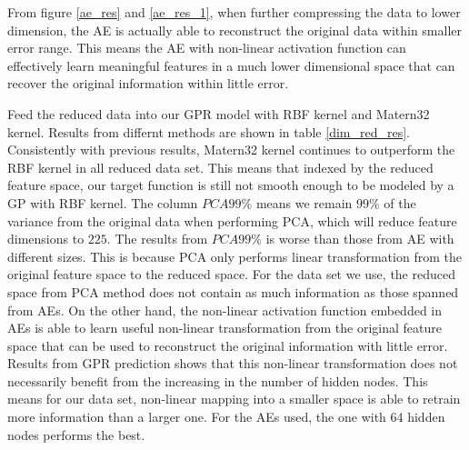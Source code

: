 \documentclass[11pt,a4paper]{article}
\theoremstyle{definition}
\numberwithin{equation}{section}
\begin{document}
	From figure \ref{ae_res} and \ref{ae_res_1}, when further compressing the data to lower dimension, the AE is actually able to reconstruct the original data within smaller error range. This means the AE with non-linear activation function can effectively learn meaningful features in a much lower dimensional space that can recover the original information within little error. 
	
	Feed the reduced data into our GPR model with RBF kernel and Matern32 kernel. Results from differnt methods are shown in table \ref{dim_red_res}. Consistently with previous results, Matern32 kernel continues to outperform the RBF kernel in all reduced data set. This means that indexed by the reduced feature space, our target function is still not smooth enough to be modeled by a GP with RBF kernel. The column $PCA99\%$ means we remain $99\%$ of the variance from the original data when performing PCA, which will reduce feature dimensions to $225$. The results from $PCA99\%$ is worse than those from AE with different sizes. This is because PCA only performs linear transformation from the original feature space to the reduced space. For the data set we use, the reduced space from PCA method does not contain as much information as those spanned from AEs. On the other hand, the non-linear activation function embedded in AEs is able to learn useful non-linear transformation from the original feature space that can be used to reconstruct the original information with little error. Results from GPR prediction shows that this non-linear transformation does not necessarily benefit from the increasing in the number of hidden nodes. This means for our data set, non-linear mapping into a smaller space is able to retrain more information than a larger one. For the AEs used, the one with 64 hidden nodes performs the best.
	 
\end{document}
